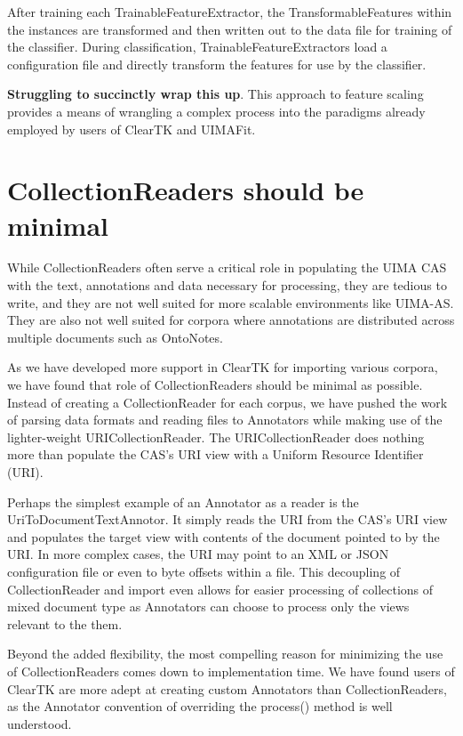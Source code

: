 \documentclass[10pt, a4paper]{article}
\begin{document}
After training each TrainableFeatureExtractor, the TransformableFeatures within the instances are transformed and then written out to the data file for training of the classifier.
During classification, TrainableFeatureExtractors load a configuration file and directly transform the features for use by the classifier.

\textbf{Struggling to succinctly wrap this up}.  This approach to feature scaling provides a means of wrangling a complex process into the paradigms already employed by users of ClearTK and UIMAFit.


\section{CollectionReaders should be minimal}

While CollectionReaders often serve a critical role in populating the UIMA CAS with the text, annotations and data necessary for processing, they are tedious to write, and they are not well suited for more scalable environments like UIMA-AS.  They are also not well suited for corpora where annotations are distributed across multiple documents such as OntoNotes.

As we have developed more support in ClearTK for importing various corpora, we have found that role of CollectionReaders should be minimal as possible.  Instead of creating a CollectionReader for each corpus, we have pushed the work of parsing data formats and reading files to Annotators while making use of the lighter-weight URICollectionReader.  The URICollectionReader does nothing more than populate the CAS's URI view with a Uniform Resource Identifier (URI).  

Perhaps the simplest example of an Annotator as a reader is the UriToDocumentTextAnnotor. It simply reads the URI from the CAS's URI view and populates the target view with contents of the document pointed to by the URI.  In more complex cases, the URI may point to an XML or JSON configuration file or even to byte offsets within a file.  This decoupling of CollectionReader and import even allows for easier processing of collections of mixed document type as Annotators can choose to process only the views relevant to the them.

Beyond the added flexibility, the most compelling reason for minimizing the use of CollectionReaders comes down to implementation time.  We have found users of ClearTK are more adept at creating custom Annotators than CollectionReaders, as the Annotator convention of overriding the process() method is well understood.
\end{document}
